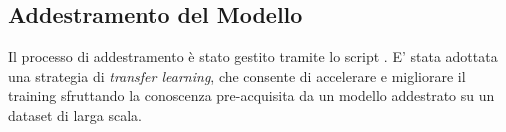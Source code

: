\documentclass[12pt,a4paper,openright,twoside]{book}
\begin{document}


\subsection{Addestramento del Modello}
\label{sec:addestramento-modello}
Il processo di addestramento è stato gestito tramite lo script 
\texttt{}. 
E' stata adottata una strategia di \emph{transfer learning}, che 
consente di accelerare e migliorare il training sfruttando la conoscenza 
pre-acquisita da un modello addestrato su un dataset di larga scala.
\end{document}
